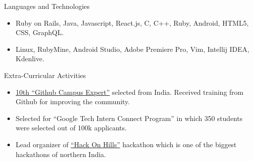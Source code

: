 \documentclass[]{mcdowellcv}
\begin{document}
	\begin{cvsection}{Languages and Technologies}
		\begin{cvsubsection}{}{}{}	
			\begin{itemize}
				\item Ruby on Rails, Java, Javascript, React.js, C, C++, Ruby, Android, HTML5, CSS, GraphQL.
				\item Linux, RubyMine, Android Studio, Adobe Premiere Pro, Vim, Intellij IDEA, Kdenlive.
			\end{itemize}
		\end{cvsubsection}
	\end{cvsection}
	
	\begin{cvsection}{Extra-Curricular Activities}
		\begin{cvsubsection}{}{}{}	
			\begin{itemize}
				\item {\href {https://githubcampus.expert/sukhbir-singh/}{10th ``Github Campus Expert''}} selected from India. Received training from Github for improving the community.
				\item Selected for ``Google Tech Intern Connect Program'' in which 350 students were selected out of 100k applicants.
				\item Lead organizer of {\href {http://hackonhills.com/}{``Hack On Hills''}} hackathon which is one of the biggest hackathons of northern India.
			\end{itemize}
		\end{cvsubsection}
	\end{cvsection}
	
\end{document}
